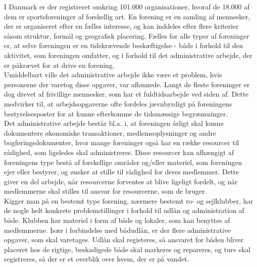 
\label{sec:indledning}
I Danmark er der registreret omkring 101.000 organisationer, hvoraf de 18.000 af dem er sportsforeninger af forskellig art. En forening er en samling af mennesker, der er organiseret efter en fælles interesse, og kan inddeles efter flere kriterier såsom struktur, formål og geografisk placering. \cite{Antal_Frivillige}\cite{DefinitionForening} Fælles for alle typer af foreninger er, at selve foreningen er en tidskrævende beskæftigelse - både i forhold til den aktivitet, som foreningen omfatter, og i forhold til det administrative arbejde, der er påkrævet for at drive en forening.\\

Umiddelbart ville det administrative arbejde ikke være et problem, hvis personerne der varetog disse opgaver, var aflønnede. Langt de fleste foreninger er dog drevet af frivillige mennesker, som har et fuldtidsarbejde ved siden af. Dette medvirker til, at arbejdsopgaverne ofte fordeles jævnbyrdigt på foreningens bestyrelsesposter for at kunne efterkomme de tidsmæssige begrænsninger.\\

Det administrative arbejde består bl.a. i, at foreningen årligt skal kunne dokumentere økonomiske transaktioner, medlemsoplysninger og andre bogføringsdokumenter, hvor mange foreninger også har en række resourcer til rådighed, som ligeledes skal administreres. Disse resourcer kan afhængigt af foreningens type bestå af forskellige områder og/eller materiel, som foreningen ejer eller bestyrer, og ønsker at stille til rådighed for deres medlemmer. Dette giver en del arbejde, når resourcerne forventes at blive ligeligt fordelt, og når medlemmerne skal stilles til ansvar for resourcerne, som de bruger.\\

Kigger man på en bestemt type forening, nærmere bestemt ro- og sejlklubber, har de nogle helt konkrete problemstillinger i forhold til udlån og administration af både. Klubben har materiel i form af både og lokaler, som kan benyttes af medlemmerne. Især i forbindelse med bådudlån, er der flere administrative opgaver, som skal varetages. Udlån skal registeres, så ansvaret for båden bliver placeret hos de rigtige, beskadigede både skal markeres og repareres, og ture skal registreres, så der er et overblik over hvem, der er på vandet. \\

